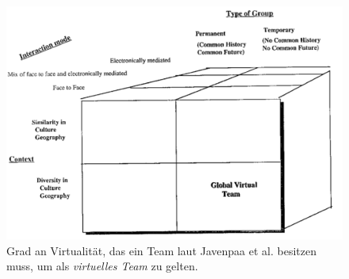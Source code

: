 \documentclass[a4paper,11pt]{article}%
\renewcommand{\\}{\vspace*{0.5\baselineskip} \newline}
\begin{document}
\begin{figure}[H]
		\begin{footnotesize}
		\centering
			\includegraphics[scale=0.6]{Abbildungen/GlobalVirtualTeam.PNG}	
			\caption[Virtualität eines virtuellen Teams]{Grad an Virtualität, das ein Team laut Javenpaa et al. \citep{jarvenpaa1999communication} besitzen muss, um als \textit{virtuelles Team} zu gelten.}
			\label{virtualTeamsVirtuality}
		\end{footnotesize}
	\end{figure}
%
\end{document}
